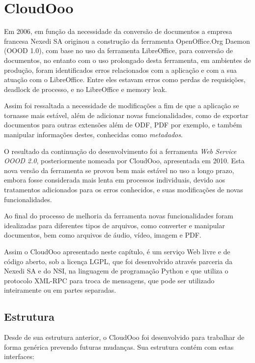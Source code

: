 \chapter{CloudOoo}
\thispagestyle{empty}

Em 2006, em função da necessidade da conversão de documentos a empresa francesa Nexedi SA originou a construção da ferramenta OpenOffice.Org Daemon (OOOD 1.0), com base no uso da ferramenta LibreOffice, para conversão de documentos, no entanto com o uso prolongado desta ferramenta, em ambientes de produção, foram identificados erros relacionados com a aplicação e com a sua atuação com o LibreOffice. Entre eles estavam erros como perdas de requisições, deadlock de processo, e no LibreOffice e memory leak.

Assim foi ressaltada a necessidade de modificações a fim de que a aplicação se tornasse mais estável, além de adicionar novas funcionalidades, como de exportar documentos para outras extensões além de ODF, PDF por exemplo, e também manipular informações destes, conhecidas como \textit{metadados}.

O resultado da continuação do desenvolvimento foi a ferramenta \textit{Web Service OOOD 2.0}, posteriormente nomeada por CloudOoo, apresentada em 2010. Esta nova versão da ferramenta se provou bem mais estável no uso a longo prazo, embora fosse considerada mais lenta em processos individuais, devido aos tratamentos adicionados para os erros conhecidos, e suas modificações de novas funcionalidades.

Ao final do processo de melhoria da ferramenta novas funcionalidades foram idealizadas para diferentes tipos de arquivos, como converter e manipular documentos, bem como arquivos de áudio, vídeo, imagem e PDF.

Assim o CloudOoo apresentado neste capítulo, é um serviço Web livre e de código aberto, sob a licença LGPL, que foi desenvolvido através parceria da Nexedi SA e do NSI, na linguagem de programação Python e que utiliza o protocolo XML-RPC para troca de mensagens, que pode ser utilizado inteiramente ou em partes separadas.

\section{Estrutura}

Desde de sua estrutura anterior, o CloudOoo foi desenvolvido para trabalhar de forma genérica prevendo futuras mudanças. Sua estrutura contém com estas interfaces:

